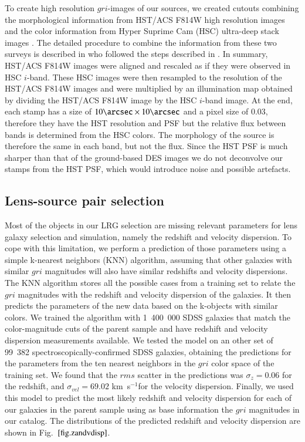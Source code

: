 \documentclass[tradiabstract,twocolumn]{aa}
\newcommand{\kms}{km~s$^{-1}$}
\begin{document}
To create high resolution $gri$-images of our sources, we created cutouts combining the morphological information from HST/ACS F814W high resolution images \citep{Leauthaud2007,Scoville2007,Koekemoer2007} and the color information from Hyper Suprime Cam (HSC) ultra-deep stack images \citep{Aihara2018}. The detailed procedure to combine the information from these two surveys is described in \cite{Canameras2020} who followed the steps described in \cite{Griffith2012}. In summary, HST/ACS F814W images were aligned and rescaled as if they were observed in HSC $i$-band. These HSC images were then resampled to the resolution of the HST/ACS F814W images and were multiplied by an illumination map obtained by dividing the HST/ACS F814W image by the HSC $i$-band image. At the end, each stamp has a size of $10 \arcsec \times 10 \arcsec$ and a pixel size of 0.03\arcsec, therefore they have the HST resolution and PSF but the relative flux between bands is determined from the HSC colors. The morphology of the source is therefore the same in each band, but not the flux. Since the HST PSF is much sharper than that of the ground-based DES images we do not deconvolve our stamps from the HST PSF, which would introduce noise and possible artefacts.

\subsection{Lens-source pair selection}\label{subsec:lenssel}

Most of the objects in our LRG selection are missing relevant parameters for lens galaxy selection and simulation, namely the redshift and velocity dispersion. To cope with this limitation, we perform a prediction of those parameters using a simple k-nearest neighbors (KNN) algorithm, assuming that other galaxies with similar $gri$ magnitudes will also have similar redshifts and velocity dispersions. The KNN algorithm stores all the possible cases from a training set to relate the $gri$ magnitudes with the redshift and velocity dispersion of the galaxies. It then predicts the parameters of the new data based on the k-objects with similar colors. We trained the algorithm with 1~400~000 SDSS galaxies that match the color-magnitude cuts of the parent sample and have redshift and velocity dispersion measurements available. We tested the model on an other set of 99~382 spectroscopically-confirmed SDSS galaxies, obtaining the predictions for the parameters from the ten nearest neighbors in the $gri$ color space of the training set. We found that the $rms$ scatter in the predictions was $\sigma_z=0.06$ for the redshift, and $\sigma_{vel}=69.02$ \kms for the velocity dispersion. Finally, we used this model to predict the most likely redshift and velocity dispersion for each of our galaxies in the parent sample using as base information the $gri$ magnitudes in our catalog. The distributions of the predicted redshift and velocity dispersion are shown in Fig.~$\ref{fig.zandvdisp}$.
\end{document}
